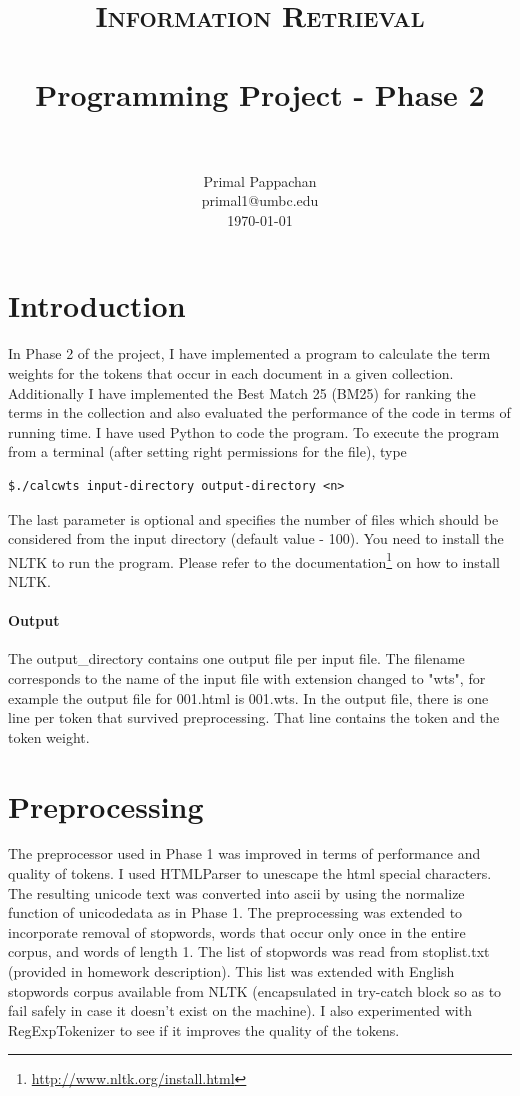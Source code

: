 \documentclass[paper=a4, fontsize=11pt]{scrartcl}
\title{
		\usefont{OT1}{bch}{b}{n}
		\normalfont \normalsize \textsc{Information Retrieval} \\ [25pt]
		\horrule{0.5pt} \\[0.4cm]
		\huge Programming Project - Phase 2 \\
		\horrule{2pt} \\[0.5cm]
}
\author{
		\normalfont 								\normalsize
        Primal Pappachan\\[-3pt]		\normalsize
        primal1@umbc.edu\\[-3pt]		\normalsize
        \today
}
\date{}
\numberwithin{equation}{section}		%
\numberwithin{figure}{section}			%
\numberwithin{table}{section}				%
\begin{document}
\maketitle
\section{Introduction}
In Phase 2 of the project, I have implemented a program to calculate the term weights for the tokens that occur in each document in a given collection. Additionally I have implemented the Best Match 25 (BM25) for ranking the terms in the collection and also evaluated the performance of the code in terms of running time. I have used Python to code the program. To execute the program from a terminal (after setting right permissions for the file), type 

\begin{verbatim}
$./calcwts input-directory output-directory <n>
\end{verbatim}

The last parameter is optional and specifies the number of files which should be considered from the input directory (default value - 100). You need to install the NLTK to run the program. Please refer to the documentation\footnote{\url{http://www.nltk.org/install.html}} on how to install NLTK.

\paragraph{Output}

The output\_directory contains one output file per input file. The filename corresponds to the name of the input file with extension changed to "wts", for example the output file for 001.html is 001.wts. In the output file, there is one line per token that survived preprocessing. That line contains the token and the token weight.

\section{Preprocessing}

The preprocessor used in Phase 1 was improved in terms of performance and quality of tokens. I used HTMLParser to unescape the html special characters. The resulting unicode text was converted into ascii by using the normalize function of unicodedata as in Phase 1. The preprocessing was extended to incorporate removal of stopwords, words that occur only once in the entire corpus, and words of length 1. The list of stopwords was read from stoplist.txt (provided in homework description). This list was extended with English stopwords corpus available from NLTK (encapsulated in try-catch block so as to fail safely in case it doesn't exist on the machine). I also experimented with RegExpTokenizer to see if it improves the quality of the tokens.
\end{document}
